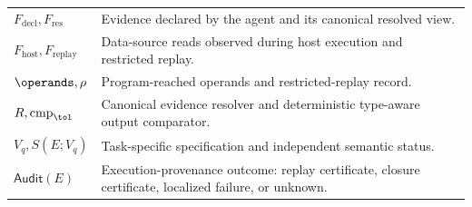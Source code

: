 \begin{table}[t]
\begin{tabularx}{\columnwidth}{@{}p{}X@{}}
$F_{\mathrm{decl}},F_{\mathrm{res}}$
&
Evidence declared by the agent and its canonical resolved view. \\

$F_{\mathrm{host}},F_{\mathrm{replay}}$
&
Data-source reads observed during host execution and restricted
replay. \\

$\operands,\rho$
&
Program-reached operands and restricted-replay record. \\

$R,\operatorname{cmp}_{\tol}$
&
Canonical evidence resolver and deterministic type-aware output
comparator. \\

$V_q,S(E;V_q)$
&
Task-specific specification and independent semantic status. \\

$\mathsf{Audit}(E)$
&
Execution-provenance outcome: replay certificate, closure
certificate, localized failure, or unknown. \\

\bottomrule
\end{tabularx}
\end{table}